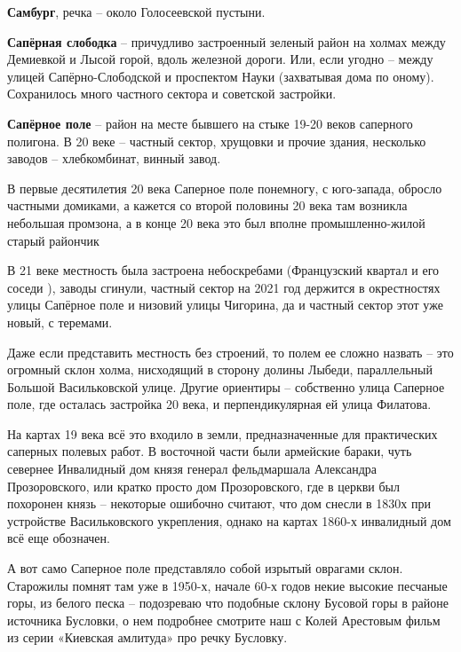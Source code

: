 \medskip

\textbf{Самбург}, речка – около Голосеевской пустыни.\\

\medskip

\textbf{Сапёрная слободка} – причудливо застроенный зеленый район на холмах между Демиевкой и Лысой горой, вдоль железной дороги. Или, если угодно – между улицей Сапёрно-Слободской и проспектом Науки (захватывая дома по оному). Сохранилось много частного сектора и советской застройки.\\

\medskip

\textbf{Сапёрное поле} – район на месте бывшего на стыке 19-20 веков саперного полигона. В 20 веке – частный сектор, хрущовки и прочие здания, несколько заводов – хлебкомбинат, винный завод.

В первые десятилетия 20 века Саперное поле понемногу, с юго-запада, обросло частными домиками, а кажется со второй половины 20 века там возникла небольшая промзона, а в конце 20 века это был вполне промышленно-жилой старый райончик

В 21 веке местность была застроена небоскребами (Французский квартал и его соседи ), заводы сгинули, частный сектор на 2021 год держится в окрестностях улицы Сапёрное поле и низовий улицы Чигорина, да и частный сектор этот уже новый, с теремами.

Даже если представить местность без строений, то полем ее сложно назвать – это огромный склон холма, нисходящий в сторону долины Лыбеди, параллельный Большой Васильковской улице. Другие ориентиры – собственно улица Саперное поле, где осталась застройка 20 века, и перпендикулярная ей улица Филатова.

   На картах 19 века всё это входило в земли, предназначенные для практических саперных полевых работ. В восточной части были армейские бараки, чуть севернее Инвалидный дом князя генерал фельдмаршала Александра Прозоровского, или кратко просто дом Прозоровского, где в церкви был похоронен князь – некоторые ошибочно считают, что дом снесли в 1830х при устройстве Васильковского укрепления, однако на картах 1860-х инвалидный дом всё еще обозначен.

А вот само Саперное поле представляло собой изрытый оврагами склон. Старожилы помнят там уже в 1950-х, начале 60-х годов некие высокие песчаные горы, из белого песка – подозреваю что подобные склону Бусовой горы в районе источника Бусловки, о нем подробнее смотрите наш с Колей Арестовым фильм из серии «Киевская амлитуда» про речку Бусловку.\\

